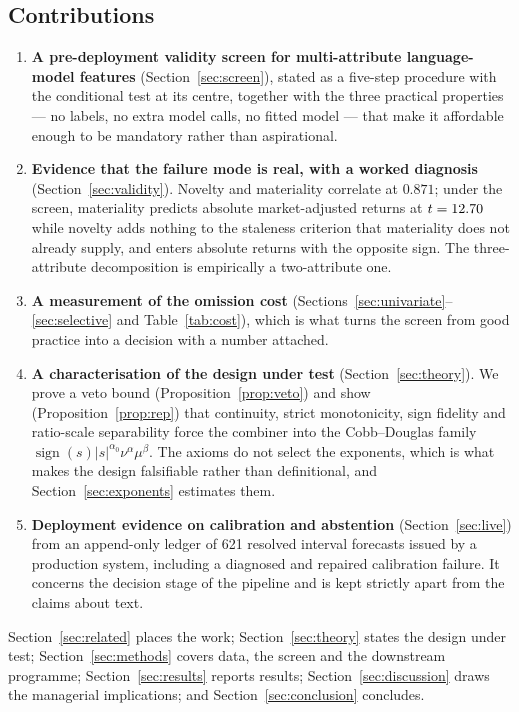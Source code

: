 \documentclass[preprint,12pt,authoryear]{elsarticle}
\theoremstyle{plain}
\theoremstyle{remark}
\begin{document}
\subsection{Contributions}

\begin{enumerate}
\item \textbf{A pre-deployment validity screen for multi-attribute
  language-model features} (Section~\ref{sec:screen}), stated as a five-step
  procedure with the conditional test at its centre, together with the three
  practical properties --- no labels, no extra model calls, no fitted model ---
  that make it affordable enough to be mandatory rather than aspirational.
\item \textbf{Evidence that the failure mode is real, with a worked diagnosis}
  (Section~\ref{sec:validity}). Novelty and materiality correlate at $0.871$;
  under the screen, materiality predicts absolute market-adjusted returns at
  $t=12.70$ while novelty adds nothing to the staleness criterion that
  materiality does not already supply, and enters absolute returns with the
  opposite sign. The three-attribute decomposition is empirically a
  two-attribute one.
\item \textbf{A measurement of the omission cost}
  (Sections~\ref{sec:univariate}--\ref{sec:selective} and
  Table~\ref{tab:cost}), which is what turns the screen from good practice into
  a decision with a number attached.
\item \textbf{A characterisation of the design under test}
  (Section~\ref{sec:theory}). We prove a veto bound
  (Proposition~\ref{prop:veto}) and show (Proposition~\ref{prop:rep}) that
  continuity, strict monotonicity, sign fidelity and ratio-scale separability
  force the combiner into the Cobb--Douglas family
  $\operatorname{sign}(s)|s|^{\alpha_0}\nu^{\alpha}\mu^{\beta}$. The axioms do
  not select the exponents, which is what makes the design falsifiable rather
  than definitional, and Section~\ref{sec:exponents} estimates them.
\item \textbf{Deployment evidence on calibration and abstention}
  (Section~\ref{sec:live}) from an append-only ledger of 621 resolved interval
  forecasts issued by a production system, including a diagnosed and repaired
  calibration failure. It concerns the decision stage of the pipeline and is
  kept strictly apart from the claims about text.
\end{enumerate}

Section~\ref{sec:related} places the work; Section~\ref{sec:theory} states the
design under test; Section~\ref{sec:methods} covers data, the screen and the
downstream programme; Section~\ref{sec:results} reports results;
Section~\ref{sec:discussion} draws the managerial implications; and
Section~\ref{sec:conclusion} concludes.
\end{document}
